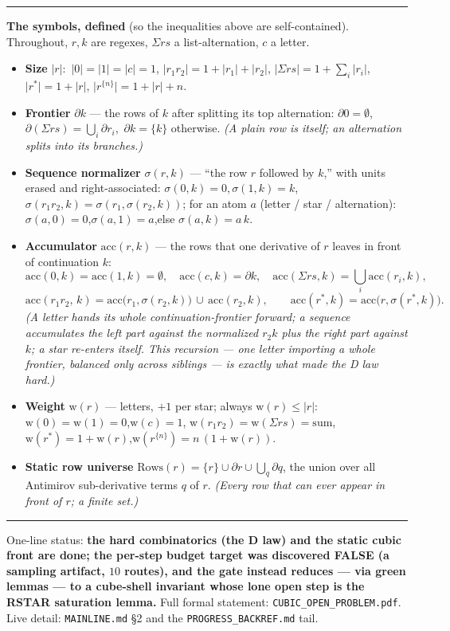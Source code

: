 \documentclass[11pt]{article}
\newcommand{\rs}[1]{\lvert #1\rvert}                  %
\newcommand{\acc}{\mathrm{acc}}                       %
\newcommand{\front}{\partial}                          %
\newcommand{\seqn}{\sigma}                             %
\newcommand{\zw}{\mathrm{w}}                           %
\newcommand{\Rows}{\mathrm{Rows}}                      %
\begin{document}
\bigskip
\hrule
\medskip
\textbf{The symbols, defined} (so the inequalities above are self-contained).
Throughout, $r,k$ are regexes, $\Sigma rs$ a list-alternation, $c$ a letter.

\begin{itemize}[leftmargin=1.4em,itemsep=4pt]

\item \textbf{Size} $\rs{r}$:\;\,
$\rs{0}=\rs{1}=\rs{c}=1$,\;
$\rs{r_1 r_2}=1+\rs{r_1}+\rs{r_2}$,\;
$\rs{\Sigma rs}=1+\textstyle\sum_i\rs{r_i}$,\;
$\rs{r^*}=1+\rs{r}$,\;
$\rs{r^{\{n\}}}=1+\rs{r}+n$.

\item \textbf{Frontier} $\front k$ --- the rows of $k$ after splitting its top
alternation:\;
$\front 0=\emptyset$,\;\,
$\front(\Sigma rs)=\bigcup_i \front{r_i}$,\;\,
$\front k=\{k\}$ otherwise.
\emph{(A plain row is itself; an alternation splits into its branches.)}

\item \textbf{Sequence normalizer} $\seqn(r,k)$ --- ``the row $r$ followed by
$k$,'' with units erased and right-associated:\;
$\seqn(0,k)=0$,\;\,$\seqn(1,k)=k$,\;\,$\seqn(r_1 r_2,k)=\seqn(r_1,\seqn(r_2,k))$;\;
for an atom $a$ (letter / star / alternation):\;
$\seqn(a,0)=0$,\;$\seqn(a,1)=a$,\;else $\seqn(a,k)=a\,k$.

\item \textbf{Accumulator} $\acc(r,k)$ --- the rows that one derivative of $r$
leaves in front of continuation $k$:
\[
\acc(0,k)=\acc(1,k)=\emptyset,\quad
\acc(c,k)=\front k,\quad
\acc(\Sigma rs,k)=\bigcup_i\acc(r_i,k),
\]
\[
\acc(r_1 r_2,\,k)=\acc\bigl(r_1,\seqn(r_2,k)\bigr)\,\cup\,\acc(r_2,k),
\qquad
\acc(r^*,k)=\acc\bigl(r,\seqn(r^*,k)\bigr).
\]
\emph{(A letter hands its whole continuation-frontier forward; a sequence
accumulates the left part against the normalized $r_2k$ plus the right part
against $k$; a star re-enters itself. This recursion --- one letter importing a
whole frontier, balanced only across siblings --- is exactly what made the
D law hard.)}

\item \textbf{Weight} $\zw(r)$ --- letters, $+1$ per star; always
$\zw(r)\le\rs{r}$:\;
$\zw(0)=\zw(1)=0$,\;$\zw(c)=1$,\;
$\zw(r_1 r_2)=\zw(\Sigma rs)=\text{sum}$,\;
$\zw(r^*)=1+\zw(r)$,\;$\zw(r^{\{n\}})=n\,(1+\zw(r))$.

\item \textbf{Static row universe} $\Rows(r)=\{r\}\cup\front r\cup\bigcup_q\front q$,
the union over all Antimirov sub-derivative terms $q$ of $r$.
\emph{(Every row that can ever appear in front of $r$; a finite set.)}

\end{itemize}

\medskip
\hrule
\medskip
{\footnotesize One-line status: \textbf{the hard combinatorics (the D law) and the
static cubic front are done; the per-step budget target was discovered FALSE (a
sampling artifact, $10$ routes), and the gate instead reduces --- via green lemmas ---
to a cube-shell invariant whose lone open step is the RSTAR saturation lemma.} Full formal statement:
\texttt{CUBIC\_OPEN\_PROBLEM.pdf}. Live detail: \texttt{MAINLINE.md} §2 and the
\texttt{PROGRESS\_BACKREF.md} tail.}
\end{document}
